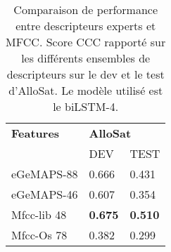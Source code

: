 \begin{table}[ht!]
    \centering
    \begin{tabular}{| l | l | l |}
    \hline
    \textbf{Features} &\multicolumn{2}{l|}{\textbf{AlloSat}} \\
    &DEV &TEST \\
    \hline
    eGeMAPS-88  &0.666  &0.431\\
    eGeMAPS-46  &0.607  &0.354\\
    Mfcc-lib 48    &\textbf{0.675}  &\textbf{0.510}\\
    Mfcc-Os 78    &0.382  &0.299\\
    \hline
\end{tabular}
    \caption{Comparaison de performance entre descripteurs experts et MFCC. Score CCC rapporté sur les différents ensembles de descripteurs sur le dev et le test d'AlloSat. Le modèle utilisé est le biLSTM-4.}
    \label{tab:egemapsVSmfcc}
\end{table}
